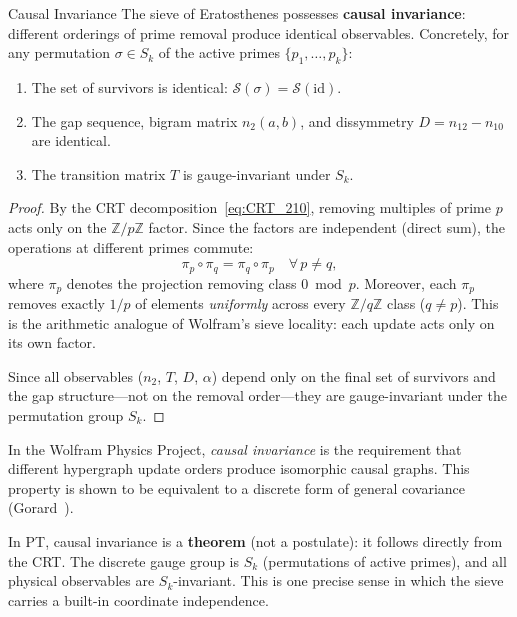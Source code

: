 \documentclass[12pt,a4paper]{article}
\begin{document}
\begin{thmbox}{Causal Invariance}
\label{thm:causal_invariance}
The sieve of Eratosthenes possesses \textbf{causal invariance}:
different orderings of prime removal produce identical observables.
Concretely, for any permutation $\sigma \in S_k$ of the active
primes $\{p_1, \ldots, p_k\}$:
\begin{enumerate}[nosep]
\item The set of survivors is identical:
  $\mathcal{S}(\sigma) = \mathcal{S}(\mathrm{id})$.
\item The gap sequence, bigram matrix $n_2(a,b)$, and dissymmetry
  $D = n_{12} - n_{10}$ are identical.
\item The transition matrix $T$ is gauge-invariant under $S_k$.
\end{enumerate}

\begin{proof}
By the CRT decomposition~\eqref{eq:CRT_210}, removing multiples of
prime $p$ acts only on the $\mathbb{Z}/p\mathbb{Z}$ factor. Since
the factors are independent (direct sum), the operations at different
primes commute:
\begin{equation}
  \pi_p \circ \pi_q = \pi_q \circ \pi_p \quad \forall\, p \neq q,
  \label{eq:commutation}
\end{equation}
where $\pi_p$ denotes the projection removing class $0 \bmod p$.
Moreover, each $\pi_p$ removes exactly $1/p$ of elements
\emph{uniformly} across every $\mathbb{Z}/q\mathbb{Z}$ class
($q \neq p$). This is the arithmetic analogue of Wolfram's sieve
locality: each update acts only on its own factor.

Since all observables ($n_2$, $T$, $D$, $\alpha$) depend only on
the final set of survivors and the gap structure---not on the
removal order---they are gauge-invariant under the permutation
group $S_k$.
\end{proof}
\end{thmbox}

\begin{remark}\mBR
\label{rem:wolfram_parallel}
In the Wolfram Physics Project, \emph{causal invariance} is the
requirement that different hypergraph update orders produce isomorphic
causal graphs. This property is shown to be equivalent to a discrete
form of general covariance (Gorard~\cite{Gorard2020}).

In PT, causal invariance is a \textbf{theorem} (not a postulate):
it follows directly from the CRT. The discrete gauge group is $S_k$
(permutations of active primes), and all physical observables are
$S_k$-invariant. This is one precise sense in which the sieve carries
a built-in coordinate independence.
\end{remark}
\end{document}
